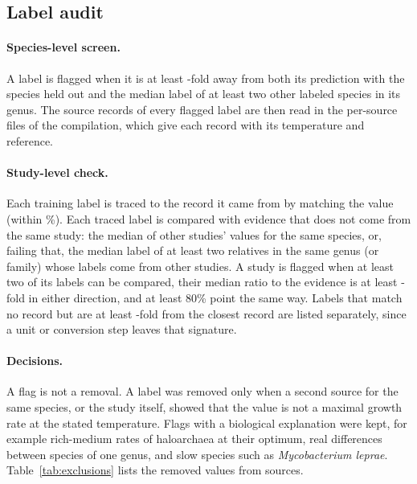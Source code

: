 

\subsection{Label audit}
\paragraph{Species-level screen.} A label is flagged when it is at least \ScreenFoldWord-fold away from both its prediction with the
species held out and the median label of at least two other labeled species in its genus. The source records of every
flagged label are then read in the per-source files of the compilation, which give each record with its temperature and
reference.

\paragraph{Study-level check.} Each training label is traced to the record it came from by matching the value (within
\TraceTolPct\%). Each traced label is compared with evidence that does not come from the same study: the median of other studies'
values for the same species, or, failing that, the median label of at least two relatives in the same genus (or family)
whose labels come from other studies. A study is flagged when at least two of its labels can be compared, their median
ratio to the evidence is at least \StudyFoldWord-fold in either direction, and at least 80\% point the same way. Labels that match no
record but are at least \StudyFoldWord-fold from the closest record are listed separately, since a unit or conversion step leaves
that signature.

\paragraph{Decisions.} A flag is not a removal. A label was removed only when a second source for the same species, or the
study itself, showed that the value is not a maximal growth rate at the stated temperature. Flags with a biological
explanation were kept, for example rich-medium rates of haloarchaea at their optimum, real differences between species of
one genus, and slow species such as \textit{Mycobacterium leprae}. Table~\ref{tab:exclusions} lists the \NExcludedWord
removed values from \NExcludedSourcesWord sources.



